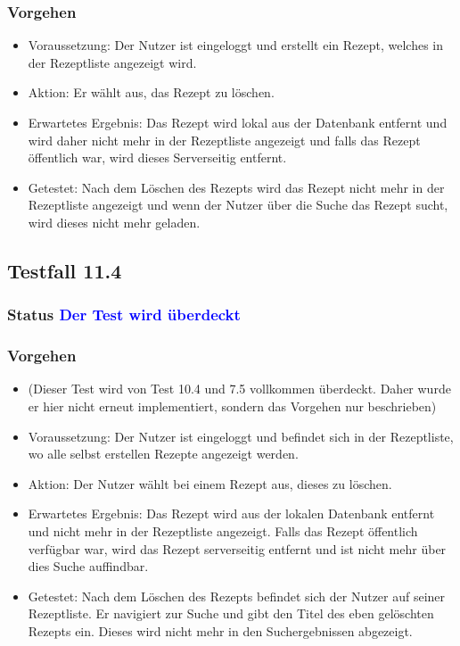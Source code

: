 \subsubsection{Vorgehen}
\begin{itemize}
\item Voraussetzung: Der Nutzer ist eingeloggt und erstellt ein Rezept, welches in der Rezeptliste angezeigt wird. 
\item Aktion: Er wählt aus, das Rezept zu löschen.
\item Erwartetes Ergebnis: Das Rezept wird lokal aus der Datenbank entfernt und wird daher nicht mehr in der Rezeptliste angezeigt und falls das Rezept öffentlich war, wird dieses Serverseitig entfernt.
\item Getestet: Nach dem Löschen des Rezepts wird das Rezept nicht mehr in der Rezeptliste angezeigt und wenn der Nutzer über die Suche das Rezept sucht, wird dieses nicht mehr geladen. 
\end{itemize}

\subsection{Testfall 11.4}
\subsubsection{Status \textcolor{blue}{ Der Test wird überdeckt}}
\subsubsection{Vorgehen}
\begin{itemize}

\item  (Dieser Test wird von Test 10.4 und 7.5 vollkommen überdeckt. Daher wurde er hier nicht erneut implementiert, sondern das Vorgehen nur beschrieben)
\item Voraussetzung: Der Nutzer ist eingeloggt und befindet sich in der Rezeptliste, wo alle selbst erstellen Rezepte angezeigt werden.
\item Aktion: Der Nutzer wählt bei einem Rezept aus, dieses zu löschen.
\item Erwartetes Ergebnis: Das Rezept wird aus der lokalen Datenbank entfernt und nicht mehr in der Rezeptliste angezeigt. Falls das Rezept öffentlich verfügbar war, wird das Rezept serverseitig entfernt und ist nicht mehr über dies Suche auffindbar. 
\item Getestet: Nach dem Löschen des Rezepts befindet sich der Nutzer auf seiner Rezeptliste. Er navigiert zur Suche und gibt den Titel des eben gelöschten Rezepts ein. Dieses wird nicht mehr in den Suchergebnissen abgezeigt. 
\end{itemize}


